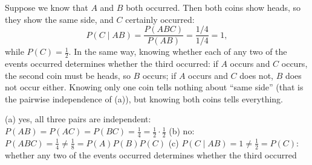 \begin{solution}
	 Suppose we know that $A$ and $B$ both occurred. Then both
	coins show heads, so they show the same side, and $C$ certainly occurred:
	\[ P(C\mid AB)=\frac{P(ABC)}{P(AB)}=\frac{1/4}{1/4}=1, \]
	while $P(C)=\frac12$. In the same way, knowing whether each of any two
	of the events occurred determines whether the third occurred: if $A$ occurs and $C$ occurs, the second coin must be heads, so
	$B$ occurs; if $A$ occurs and $C$ does not, $B$ does not occur either.
	Knowing only one coin tells nothing about ``same side'' (that is
	the pairwise independence of (a)), but knowing both coins tells
	everything.
	\begin{answer}
		(a) yes, all three pairs are independent:
		$P(AB)=P(AC)=P(BC)=\frac14=\frac12\cdot\frac12$ \quad
		(b) no: $P(ABC)=\frac14\ne\frac18=P(A)P(B)P(C)$ \quad
		(c) $P(C\mid AB)=1\ne\frac12=P(C)$: whether any two of the events
		occurred determines whether the third occurred
	\end{answer}
\end{solution}
